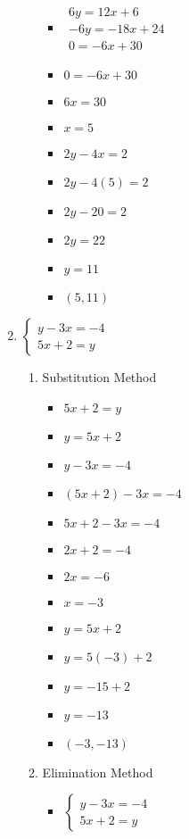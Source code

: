 \documentclass{article}
\begin{document}
\begin{enumerate}
\begin{enumerate}
\begin{itemize}
    \item $\begin{array}{l}
          6y=12x+6 \\
          -6y=-18x+24 \\ \hline
          0=-6x+30\end{array}$
    \item $0=-6x+30$
    \item $6x=30$
    \item $x=5$
    \item $2y-4x=2$
    \item $2y-4(5)=2$
    \item $2y-20=2$
    \item $2y=22$
    \item $y=11$
    \item $(5,11)$
    \end{itemize}
  \end{enumerate}
\item $\left\{ \begin{array}{l}
      y-3x=-4 \\
      5x+2=y \end{array} \right.$
  \begin{enumerate}
  \item Substitution Method
    \begin{itemize}
    \item $5x+2=y$
    \item $y=5x+2$
    \item $y-3x=-4$
    \item $(5x+2)-3x=-4$
    \item $5x+2-3x=-4$
    \item $2x+2=-4$
    \item $2x=-6$
    \item $x=-3$
    \item $y=5x+2$
    \item $y=5(-3)+2$
    \item $y=-15+2$
    \item $y=-13$
    \item $(-3,-13)$
    \end{itemize}
  \item Elimination Method
    \begin{itemize}
    \item $\left\{ \begin{array}{l}
          y-3x=-4 \\
          5x+2=y \end{array} \right.$

\end{itemize}
\end{enumerate}
\end{enumerate}
\end{document}
